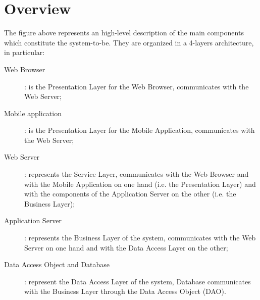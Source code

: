 \documentclass[../../DD.tex]{subfiles}
\begin{document}
\section{Overview\label{sect:2.1}}


The figure above represents an high-level description of the main components which constitute the system-to-be. They are organized in a 4-layers architecture, in particular:
\begin{description}
	\item [Web Browser]: is the Presentation Layer for the  Web Browser, communicates with the Web Server;
	\item [Mobile application]: is the Presentation Layer for the  Mobile Application, communicates with the Web Server;
	\item [Web Server]: represents the Service Layer, communicates with the  Web Browser and with the Mobile Application on one hand (i.e. the Presentation Layer) and with the components of the Application Server on the other (i.e. the Business Layer);
	\item [Application Server]: represents the Business Layer of the system, communicates with the Web Server on one hand and with the Data Access Layer on the other; 
	\item [Data Access Object and Database]: represent the Data Access Layer of the system, Database communicates with the Business Layer through the Data Access Object (DAO).
\end{description}

\newpage
\end{document}
